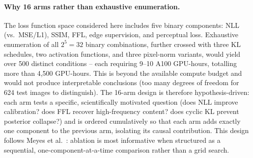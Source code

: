 \documentclass[12pt, a4paper, twoside, openright]{book}
\begin{document}
\paragraph{Why 16 arms rather than exhaustive enumeration.}
The loss function space considered here includes five binary components: NLL (vs.\ MSE/L1), SSIM, FFL, edge supervision, and perceptual loss. Exhaustive enumeration of all $2^5 = 32$ binary combinations, further crossed with three KL schedules, two activation functions, and three pixel-norm variants, would yield over 500 distinct conditions -- each requiring 9--10 A100 GPU-hours, totalling more than 4,500 GPU-hours. This is beyond the available compute budget and would not produce interpretable conclusions (too many degrees of freedom for 624 test images to distinguish). The 16-arm design is therefore hypothesis-driven: each arm tests a specific, scientifically motivated question (does NLL improve calibration? does FFL recover high-frequency content? does cyclic KL prevent posterior collapse?) and is ordered cumulatively so that each arm adds exactly one component to the previous arm, isolating its causal contribution. This design follows Meyes et al.\ \cite{meyes_ablation_2019}: ablation is most informative when structured as a sequential, one-component-at-a-time comparison rather than a grid search.
\end{document}
